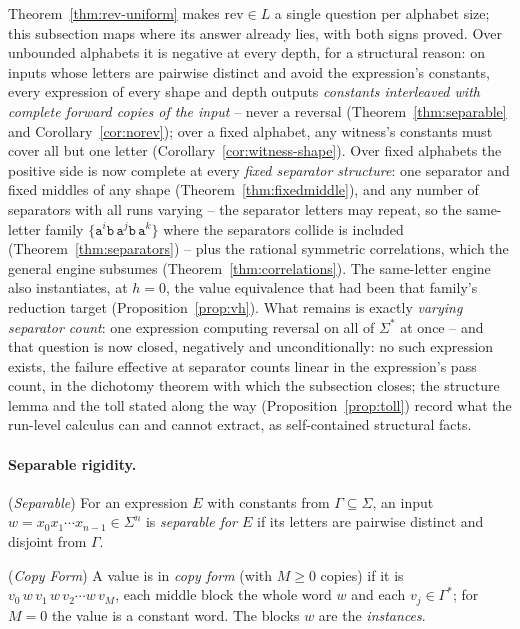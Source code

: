 \documentclass[runningheads,envcountsect]{llncs}
\begin{document}
Theorem~\ref{thm:rev-uniform} makes $\mathrm{rev} \in L$ a single question per alphabet size; this subsection maps where its answer already lies, with both signs proved. Over unbounded alphabets it is negative at every depth, for a structural reason: on inputs whose letters are pairwise distinct and avoid the expression's constants, every expression of every shape and depth outputs \emph{constants interleaved with complete forward copies of the input} -- never a reversal (Theorem~\ref{thm:separable} and Corollary~\ref{cor:norev}); over a fixed alphabet, any witness's constants must cover all but one letter (Corollary~\ref{cor:witness-shape}). Over fixed alphabets the positive side is now complete at every \emph{fixed separator structure}: one separator and fixed middles of any shape (Theorem~\ref{thm:fixedmiddle}), and any number of separators with all runs varying -- the separator letters may repeat, so the same-letter family $\{\mathtt a^i\mathtt b\,\mathtt a^j\mathtt b\,\mathtt a^k\}$ where the separators collide is included (Theorem~\ref{thm:separators}) -- plus the rational symmetric correlations, which the general engine subsumes (Theorem~\ref{thm:correlations}). The same-letter engine also instantiates, at $h = 0$, the value equivalence that had been that family's reduction target (Proposition~\ref{prop:vh}). What remains is exactly \emph{varying separator count}: one expression computing reversal on all of $\Sigma^*$ at once -- and that question is now closed, negatively and unconditionally: no such expression exists, the failure effective at separator counts linear in the expression's pass count, in the dichotomy theorem with which the subsection closes; the structure lemma and the toll stated along the way (Proposition~\ref{prop:toll}) record what the run-level calculus can and cannot extract, as self-contained structural facts.

\paragraph{Separable rigidity.}

\begin{definition}
    (\emph{Separable})
    \label{def:separable}
    For an expression $E$ with constants from $\Gamma \subseteq \Sigma$, an input $w = x_0 x_1 \cdots x_{n-1} \in \Sigma^n$ is \emph{separable for $E$} if its letters are pairwise distinct and disjoint from $\Gamma$.
\end{definition}

\begin{definition}
    (\emph{Copy Form})
    \label{def:copyform}
    A value is in \emph{copy form} (with $M \geq 0$ copies) if it is $v_0\,w\,v_1\,w\,v_2 \cdots w\,v_M$, each middle block the whole word $w$ and each $v_j \in \Gamma^*$; for $M = 0$ the value is a constant word. The blocks $w$ are the \emph{instances}.
\end{definition}
\end{document}
